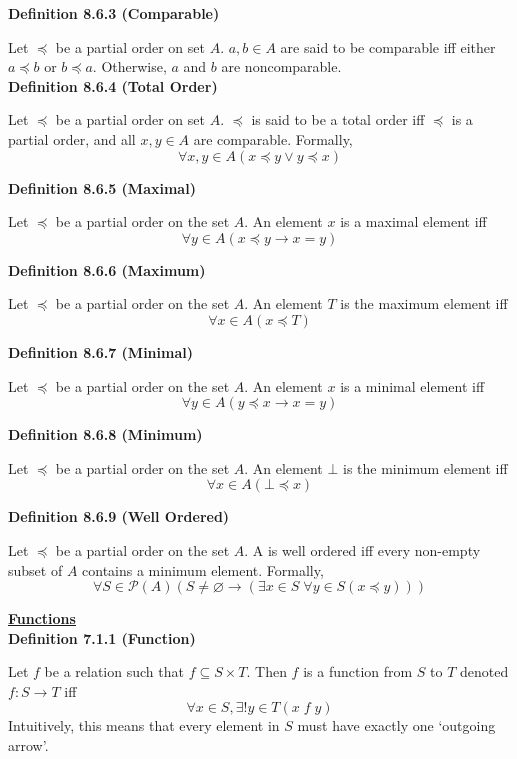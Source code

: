 \documentclass[a4paper]{article}
\newcommand{\heading}[1]{{\small\underline{\textbf{#1}}}}
\newcommand{\subheading}[1]{{\scriptsize\textbf{#1}}}
\begin{document}
\begin{multicols*}{4}
\subheading{Definition 8.6.3 (Comparable)}

Let $\preceq$ be a partial order on set $A$. $a, b \in A$ are said to be
comparable iff either $a \preceq b$ or $b \preceq a$. Otherwise, $a$ and $b$ are
noncomparable. \\

\subheading{Definition 8.6.4 (Total Order)}

Let $\preceq$ be a partial order on set $A$. $\preceq$ is said to be a total
order iff $\preceq$ is a partial order, and all $x, y \in A$ are comparable.
Formally,
$$\forall x, y \in A(x \preceq y \lor y \preceq x)$$

\subheading{Definition 8.6.5 (Maximal)}

Let $\preceq$ be a partial order on the set $A$. An element $x$ is a maximal
element iff $$\forall y \in A (x \preceq y \rightarrow x = y)$$

\subheading{Definition 8.6.6 (Maximum)}

Let $\preceq$ be a partial order on the set $A$. An element $T$ is the maximum
element iff $$\forall x \in A (x \preceq T)$$

\subheading{Definition 8.6.7 (Minimal)}

Let $\preceq$ be a partial order on the set $A$. An element $x$ is a minimal
element iff $$\forall y \in A (y \preceq x \rightarrow x = y)$$

\subheading{Definition 8.6.8 (Minimum)}

Let $\preceq$ be a partial order on the set $A$. An element $\bot$ is the
minimum element iff $$\forall x \in A (\bot \preceq x)$$

\subheading{Definition 8.6.9 (Well Ordered)}

Let $\preceq$ be a partial order on the set $A$. A is well ordered iff every
non-empty subset of $A$ contains a minimum element. Formally,
$$\forall S \in \mathcal{P}(A) (S \neq \varnothing \rightarrow
  (\exists x \in S\;\forall y \in S(x \preceq y)))$$

\heading{Functions} \\

\subheading{Definition 7.1.1 (Function)}

Let $f$ be a relation such that $f \subseteq S \times T$. Then $f$ is a function
from $S$ to $T$ denoted $f: S\rightarrow T$ iff
$$\forall x \in S, \exists! y \in T(x\;f\;y)$$
Intuitively, this means that every element in $S$ must have exactly one
`outgoing arrow'.\\


\end{multicols*}
\end{document}
